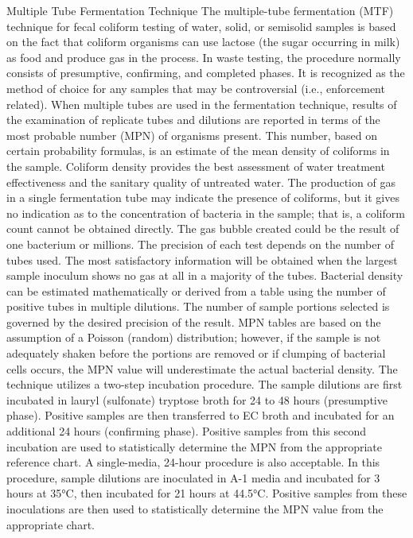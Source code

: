 \documentclass{article}
\begin{document}
Multiple Tube Fermentation Technique The multiple-tube fermentation
(MTF) technique for fecal coliform testing of water, solid, or semisolid
samples is based on the fact that coliform organisms can use lactose
(the sugar occurring in milk) as food and produce gas in the process. In
waste testing, the procedure normally consists of presumptive,
confirming, and completed phases. It is recognized as the method of
choice for any samples that may be controversial (i.e., enforcement
related). When multiple tubes are used in the fermentation technique,
results of the examination of replicate tubes and dilutions are reported
in terms of the most probable number (MPN) of organisms present. This
number, based on certain probability formulas, is an estimate of the
mean density of coliforms in the sample. Coliform density provides the
best assessment of water treatment effectiveness and the sanitary
quality of untreated water. The production of gas in a single
fermentation tube may indicate the presence of coliforms, but it gives
no indication as to the concentration of bacteria in the sample; that
is, a coliform count cannot be obtained directly. The gas bubble created
could be the result of one bacterium or millions. The precision of each
test depends on the number of tubes used. The most satisfactory
information will be obtained when the largest sample inoculum shows no
gas at all in a majority of the tubes. Bacterial density can be
estimated mathematically or derived from a table using the number of
positive tubes in multiple dilutions. The number of sample portions
selected is governed by the desired precision of the result. MPN tables
are based on the assumption of a Poisson (random) distribution; however,
if the sample is not adequately shaken before the portions are removed
or if clumping of bacterial cells occurs, the MPN value will
underestimate the actual bacterial density. The technique utilizes a
two-step incubation procedure. The sample dilutions are first incubated
in lauryl (sulfonate) tryptose broth for 24 to 48 hours (presumptive
phase). Positive samples are then transferred to EC broth and incubated
for an additional 24 hours (confirming phase). Positive samples from
this second incubation are used to statistically determine the MPN from
the appropriate reference chart. A single-media, 24-hour procedure is
also acceptable. In this procedure, sample dilutions are inoculated in
A-1 media and incubated for 3 hours at 35°C, then incubated for 21 hours
at 44.5°C. Positive samples from these inoculations are then used to
statistically determine the MPN value from the appropriate chart.
\end{document}
